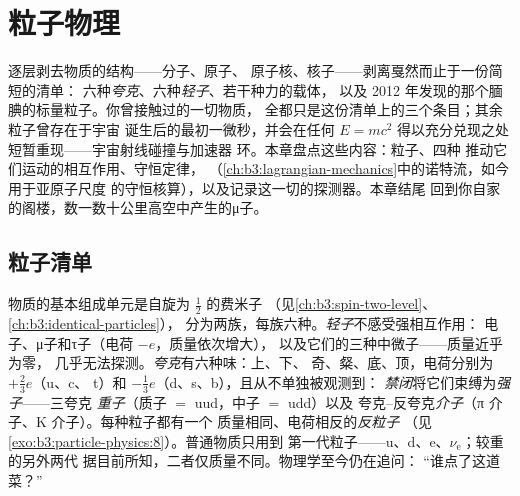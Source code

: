 \chapter{粒子物理}\label{ch:b3:particle-physics}


逐层剥去物质的结构——分子、原子、
原子核、核子——剥离戛然而止于一份简短的清单：
六种\emph{夸克}、六种\emph{轻子}、若干种力的载体，
以及 2012 年发现的那个腼腆的标量粒子。你曾接触过的一切物质，
全都只是这份清单上的三个条目；其余粒子曾存在于宇宙
诞生后的最初一微秒，并会在任何
$E = mc^2$ 得以充分兑现之处短暂重现——宇宙射线碰撞与加速器
环。本章盘点这些内容：粒子、四种
推动它们运动的相互作用、守恒定律，
（\cref{ch:b3:lagrangian-mechanics}中的诺特流，如今用于亚原子尺度
的守恒核算），以及记录这一切的探测器。本章结尾
回到你自家的阁楼，数一数十公里高空中产生的μ子。

\section{粒子清单}

\begin{definition}[轻子、夸克、强子]\label{def:b3:particle-physics:zoo}
物质的基本组成单元是自旋为 $\tfrac12$ 的费米子
（见\cref{ch:b3:spin-two-level}、\cref{ch:b3:identical-particles}），
分为两族，每族六种。\emph{轻子}不感受强相互作用：
电子、μ子和τ子（电荷 $-e$，质量依次增大），
以及它们的三种中微子——质量近乎为零，
几乎无法探测。\emph{夸克}有六种味：上、下、
奇、粲、底、顶，电荷分别为 $+\tfrac23e$（u、c、
t）和 $-\tfrac13e$（d、s、b），且从不单独被观测到：
\emph{禁闭}将它们束缚为\emph{强子}——三夸克
\emph{重子}（质子 $=$ uud，中子 $=$ udd）以及
夸克–反夸克\emph{介子}（π 介子、K 介子）。每种粒子都有一个
质量相同、电荷相反的\emph{反粒子}
（见\cref{exo:b3:particle-physics:8}）。普通物质只用到
第一代粒子——u、d、e、$\nu_{\text{e}}$；较重的另外两代
据目前所知，二者仅质量不同。物理学至今仍在追问：
“谁点了这道菜？”
\end{definition}

